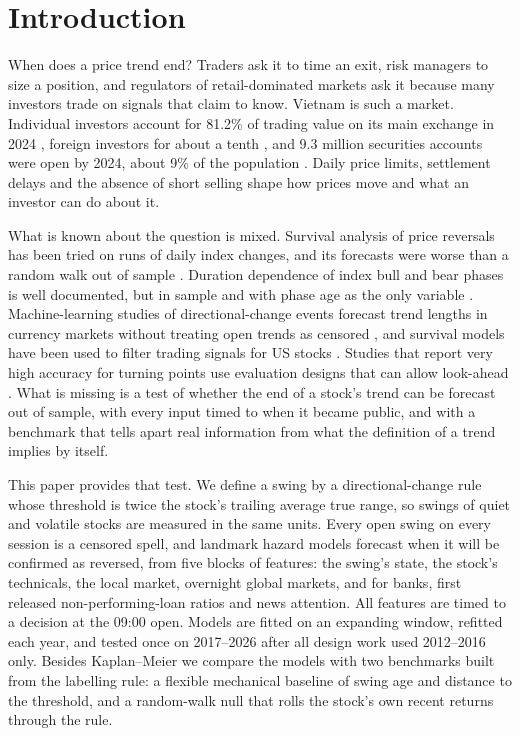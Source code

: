 \section{Introduction}\label{sec:intro}

When does a price trend end? Traders ask it to time an exit, risk managers to size a position, and
regulators of retail-dominated markets ask it because many investors trade on signals that claim
to know. Vietnam is such a market. Individual investors account for 81.2\% of trading value on its
main exchange in 2024 \citep{SHS2025}, foreign investors for about a tenth \citep{HOSE2025}, and
9.3 million securities accounts were open by 2024, about 9\% of the population \citep{SSC2025}.
Daily price limits, settlement delays and the absence of short selling shape how prices move and
what an investor can do about it.

What is known about the question is mixed. Survival analysis of price reversals has been tried on
runs of daily index changes, and its forecasts were worse than a random walk out of sample
\citep{Yao2005}. Duration dependence of index bull and bear phases is well documented, but in
sample and with phase age as the only variable \citep{LundeTimmermann2004,Zakamulin2023}.
Machine-learning studies of directional-change events forecast trend lengths in currency markets
without treating open trends as censored \citep{AdegboyeKampouridis2021}, and survival models have
been used to filter trading signals for US stocks \citep{HuZhou2024}. Studies that report very high
accuracy for turning points use evaluation designs that can allow look-ahead
\citep{Abolmakarem2024}. What is missing is a test of whether the end of a stock's trend can be
forecast out of sample, with every input timed to when it became public, and with a benchmark that
tells apart real information from what the definition of a trend implies by itself.

This paper provides that test. We define a swing by a directional-change rule whose threshold is
twice the stock's trailing average true range, so swings of quiet and volatile stocks are measured
in the same units. Every open swing on every session is a censored spell, and landmark hazard
models forecast when it will be confirmed as reversed, from five blocks of features: the swing's
state, the stock's technicals, the local market, overnight global markets, and for banks, first
released non-performing-loan ratios and news attention. All features are timed to a decision at
the 09:00 open. Models are fitted on an expanding window, refitted each year, and tested once on
2017--2026 after all design work used 2012--2016 only. Besides Kaplan--Meier we compare the
models with two benchmarks built from the labelling rule: a flexible mechanical baseline of swing age
and distance to the threshold, and a random-walk null that rolls the stock's own recent returns
through the rule.

